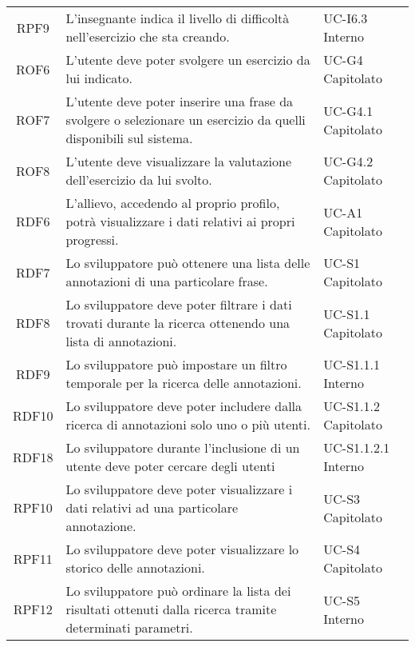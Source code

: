 \begin{tabularx}{\textwidth}{| c | p{10cm} | X |}
		RPF9 & L'insegnante indica il livello di difficoltà nell'esercizio che sta creando. & UC-I6.3 \newline Interno\\
		ROF6 & L'utente deve poter svolgere un esercizio da lui indicato. & UC-G4 \newline Capitolato\\
		ROF7 & L'utente deve poter inserire una frase da svolgere o selezionare un esercizio da quelli disponibili sul sistema. & UC-G4.1 \newline Capitolato\\
		ROF8 & L'utente deve visualizzare la valutazione dell'esercizio da lui svolto. & UC-G4.2 \newline Capitolato\\
		RDF6 & L'allievo, accedendo al proprio profilo, potrà visualizzare i dati relativi ai propri progressi. & UC-A1 \newline Capitolato\\
		RDF7 & Lo sviluppatore può ottenere una lista delle annotazioni di una particolare frase. & UC-S1 \newline Capitolato\\
		RDF8 & Lo sviluppatore deve poter filtrare i dati trovati durante la ricerca ottenendo una lista di annotazioni. & UC-S1.1 \newline Capitolato\\
		RDF9 & Lo sviluppatore può impostare un filtro temporale per la ricerca delle annotazioni. & UC-S1.1.1 \newline Interno\\
		RDF10 & Lo sviluppatore deve poter includere dalla ricerca di annotazioni solo uno o più utenti. & UC-S1.1.2 \newline Capitolato\\
		RDF18 & Lo sviluppatore durante l'inclusione di un utente deve poter cercare degli utenti & UC-S1.1.2.1 \newline Interno\\		
		RPF10 & Lo sviluppatore deve poter visualizzare i dati relativi ad una particolare annotazione. & UC-S3 \newline Capitolato\\
		RPF11 & Lo sviluppatore deve poter visualizzare lo storico delle annotazioni. & UC-S4 \newline Capitolato\\
		RPF12 & Lo sviluppatore può ordinare la lista dei risultati ottenuti dalla ricerca tramite determinati parametri. & UC-S5 \newline Interno\\	

\end{tabularx}
